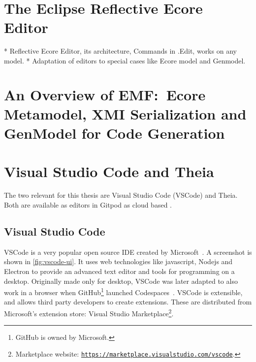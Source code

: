\section{The Eclipse Reflective Ecore Editor}

* Reflective Ecore Editor, its architecture, Commands in .Edit, works on any model.
* Adaptation of editors to special cases like Ecore model and Genmodel.

\section{An Overview of EMF:\ Ecore Metamodel, XMI Serialization and GenModel for Code Generation}\label{sec:emf-metamodel}



\section{Visual Studio Code and Theia}

The two  relevant for this thesis are Visual Studio Code (\gls{VSCode}) and \gls{Theia}.
Both are available as editors in \gls{Gitpod} as cloud based .

\subsection{Visual Studio Code}

\Gls{VSCode} is a very popular \gls{open source} \acrshort{IDE} created by Microsoft~\cite{stackoverflowStackOverflowDeveloper2019}.
A screenshot is shown in \cref{fig:vscode-ui}.
It uses web technologies like javascript, \gls{Nodejs} and \gls{Electron} to provide an advanced text editor and tools for programming on a desktop.
Originally made only for desktop, \gls{VSCode} was later adapted to also work in a browser when \gls{GitHub}\footnote{GitHub is owned by Microsoft.} launched Codespaces~\cite{svenefftingeProductRoadmapQ1}.
\Gls{VSCode} is extensible, and allows third party developers to create extensions.
These are distributed from Microsoft's extension store: Visual Studio Marketplace\footnote{Marketplace website: \href{https://marketplace.visualstudio.com/vscode}{\nolinkurl{https://marketplace.visualstudio.com/vscode}}.}.

